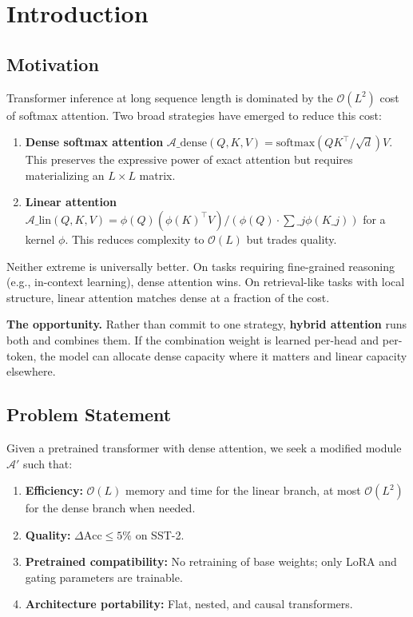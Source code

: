 
\section{Introduction}

\subsection{Motivation}

Transformer inference at long sequence length is dominated by the 
$\mathcal{O}(L^2)$ cost of softmax attention. Two broad strategies have 
emerged to reduce this cost:

\begin{enumerate}
\item \textbf{Dense softmax attention} $\mathcal{A}\_\text{dense}(Q, K, V) =
  \text{softmax}(QK^\top / \sqrt{d}) V$. This preserves the expressive power
  of exact attention but requires materializing an $L \times L$ matrix.

\item \textbf{Linear attention} $\mathcal{A}\_\text{lin}(Q, K, V) =
  \phi(Q) (\phi(K)^\top V) / (\phi(Q) \cdot \sum\_j \phi(K\_j))$ for a kernel
  $\phi$. This reduces complexity to $\mathcal{O}(L)$ but trades quality.

\end{enumerate}
Neither extreme is universally better. On tasks requiring fine-grained 
reasoning (e.g., in-context learning), dense attention wins. On retrieval-like 
tasks with local structure, linear attention matches dense at a fraction of 
the cost.

\textbf{The opportunity.} Rather than commit to one strategy, \textbf{hybrid attention} 
runs both and combines them. If the combination weight is learned per-head 
and per-token, the model can allocate dense capacity where it matters and 
linear capacity elsewhere.

\subsection{Problem Statement}

Given a pretrained transformer with dense attention, we seek a modified 
module $\mathcal{A}'$ such that:

\begin{enumerate}
\item \textbf{Efficiency:} $\mathcal{O}(L)$ memory and time for the linear branch,
  at most $\mathcal{O}(L^2)$ for the dense branch when needed.
\item \textbf{Quality:} $\Delta\text{Acc} \leq 5\%$ on SST-2.
\item \textbf{Pretrained compatibility:} No retraining of base weights; only LoRA
  and gating parameters are trainable.
\item \textbf{Architecture portability:} Flat, nested, and causal transformers.

\end{enumerate}
